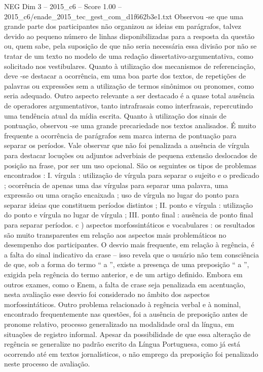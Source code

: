 \begin{textsample}{NEG Dim 3 – 2015\_c6 – Score 1.00 – 2015\_c6/enade\_2015\_tec\_gest\_com\_d1f662b3e1.txt}
Observou -se que uma grande parte dos participantes não organizou as ideias em parágrafos, talvez devido ao pequeno número de linhas disponibilizadas para a resposta da questão ou, quem sabe, pela suposição de que não seria necessária essa divisão por não se tratar de um texto no modelo de uma redação dissertativo-argumentativa, como solicitado nos vestibulares.
Quanto à utilização dos mecanismos de referenciação, deve -se destacar a ocorrência, em uma boa parte dos textos, de repetições de palavras ou expressões sem a utilização de termos sinônimos ou pronomes, como seria adequado.
Outro aspecto relevante a ser destacado é a quase total ausência de operadores argumentativos, tanto intrafrasais como interfrasais, repercutindo uma tendência atual da mídia escrita.
Quanto à utilização dos sinais de pontuação, observou -se uma grande precariedade nos textos analisados.
É muito frequente a ocorrência de parágrafos sem marca interna de pontuação para separar os períodos.
Vale observar que não foi penalizada a ausência de vírgula para destacar locuções ou adjuntos adverbiais de pequena extensão deslocados de posição na frase, por ser um uso opcional.
São os seguintes os tipos de problemas encontrados : I. vírgula : utilização de vírgula para separar o sujeito e o predicado ; ocorrência de apenas uma das vírgulas para separar uma palavra, uma expressão ou uma oração encaixada ; uso de vírgula no lugar do ponto para separar ideias que constituem períodos distintos ; II. ponto e vírgula : utilização do ponto e vírgula no lugar de vírgula ; III. ponto final : ausência de ponto final para separar períodos. c ) aspectos morfossintáticos e vocabulares : os resultados são muito transparentes em relação aos aspectos mais problemáticos no desempenho dos participantes.
O desvio mais frequente, em relação à regência, é a falta do sinal indicativo da crase – isso revela que o usuário não tem consciência de que, sob a forma do termo “ a ”, existe a presença de uma preposição “ a ”, exigida pela regência do termo anterior, e de um artigo definido.
Embora em outros exames, como o Enem, a falta de crase seja penalizada em acentuação, nesta avaliação esse desvio foi considerado no âmbito dos aspectos morfossintáticos.
Outro problema relacionado à regência verbal e à nominal, encontrado frequentemente nas questões, foi a ausência de preposição antes de pronome relativo, processo generalizado na modalidade oral da língua, em situações de registro informal.
Apesar da possibilidade de que essa alteração de regência se generalize no padrão escrito da Língua Portuguesa, como já está ocorrendo até em textos jornalísticos, o não emprego da preposição foi penalizado neste processo de avaliação.

\end{textsample}
